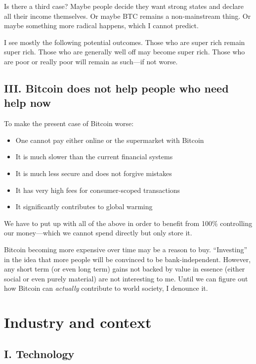 Is there a third case? Maybe people decide they want strong states and declare all their income themselves. Or maybe BTC remains a non-mainstream thing. Or maybe something more radical happens, which I cannot predict.

I see mostly the following potential outcomes. Those who are super rich remain super rich. Those who are generally well off may become super rich. Those who are poor or really poor will remain as such—if not worse.

\subsection{III. Bitcoin does not help people who need help now}

To make the present case of Bitcoin worse:

\begin{itemize}
    \item{One cannot pay either online or the supermarket with Bitcoin}
    \item{It is much slower than the current financial systems}
    \item{It is much less secure and does not forgive mistakes}
    \item{It has very high fees for consumer-scoped transactions}
    \item{It significantly contributes to global warming}
\end{itemize}

We have to put up with all of the above in order to benefit from 100\% controlling our money—which we cannot spend directly but only store it.

Bitcoin becoming more expensive over time may be a reason to buy. “Investing” in the idea that more people will be convinced to be bank-independent. However, any short term (or even long term) gains not backed by value in essence (either social or even purely material) are not interesting to me. Until we can figure out how Bitcoin can \emph{actually} contribute to world society, I denounce it.

\section{Industry and context}

\subsection{I. Technology}


